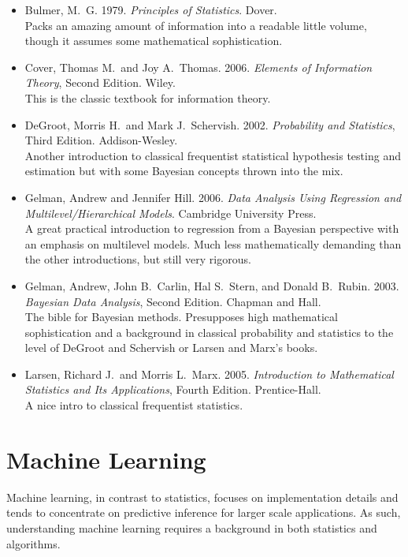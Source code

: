 \begin{itemize}
%
\item
Bulmer, M.~G.
1979.
{\it Principles of Statistics}.
Dover.
\\
{\footnotesize Packs an amazing amount of information into
a readable little volume, though it assumes some mathematical
sophistication.}
%
\item Cover, Thomas M.\ and Joy A.\ Thomas.
2006.
{\it Elements of Information Theory}, Second Edition.
Wiley.
\\
{\footnotesize This is the classic textbook for information theory.}
%
\item
DeGroot, Morris H.\ and Mark J.\ Schervish.
2002.
{\it Probability and Statistics},  Third Edition.
Addison-Wesley.
\\
{\footnotesize Another introduction to classical frequentist
statistical hypothesis testing and estimation but with some Bayesian
concepts thrown into the mix.}
%
\item
Gelman, Andrew and Jennifer Hill.
2006.
{\it Data Analysis Using Regression and Multilevel/Hierarchical Models}.
Cambridge University Press.
\\
{\footnotesize A great practical introduction to regression from a Bayesian
perspective with an emphasis on multilevel models.  Much less mathematically
demanding than the other introductions, but still very rigorous.}
%
\item
Gelman, Andrew, John B.~Carlin, Hal S.\ Stern, and Donald B.\ Rubin.
2003.
{\it Bayesian Data Analysis}, Second Edition.
Chapman and Hall.
\\
{\footnotesize The bible for Bayesian methods.  Presupposes high
mathematical sophistication and a background in classical probability
and statistics to the level of DeGroot and Schervish or Larsen
and Marx's books.}
%
\item
Larsen, Richard J.\ and Morris L.\ Marx.
2005.
{\it Introduction to Mathematical Statistics and Its Applications}, Fourth Edition.
Prentice-Hall.
\\
{\footnotesize A nice intro to classical frequentist statistics.}
%
\end{itemize}


\section{Machine Learning}

\noindent
Machine learning, in contrast to statistics, focuses on implementation
details and tends to concentrate on predictive inference for larger
scale applications.  As such, understanding machine learning requires
a background in both statistics and algorithms.

